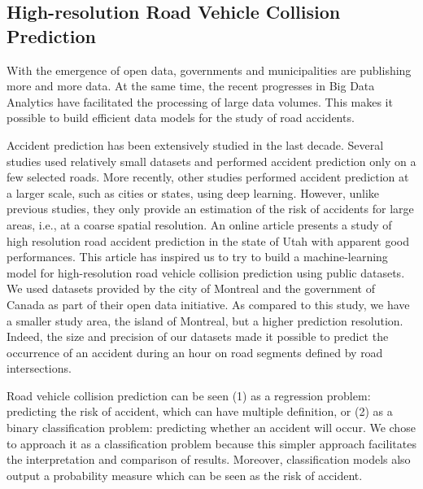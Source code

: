 \documentclass[conference]{IEEEtran}
\begin{document}

\subsection{High-resolution Road Vehicle Collision Prediction}

With the emergence of open data, governments and municipalities are publishing more and more data. At the same time, the recent progresses in Big Data Analytics have facilitated the processing of large data volumes. This makes it possible to build efficient data models for the study of road accidents.

Accident prediction has been extensively studied in the last decade. Several studies used relatively small datasets and performed accident prediction only on a few selected roads\cite{Chang2005, Chang2005b, Lin2015, Theofilatos2017}. More recently, other studies performed accident prediction at a larger scale, such as cities or states, using deep 
learning\cite{QChen2016, Najjar2017, Yuan2018}.
However, unlike previous studies, they only provide an estimation of the risk of accidents for large areas, i.e., at a coarse spatial resolution. An online article\cite{mediumarticle} presents a study of high resolution road accident prediction in the state of Utah with apparent good performances. This article has inspired us to try to build a machine-learning model for high-resolution road vehicle collision prediction using public datasets. We used datasets provided by the city of Montreal and the government of Canada as part of their open data initiative. As compared to this study, we have a smaller study area, the island of Montreal, but a higher prediction resolution. Indeed, the size and precision of our datasets made it possible to predict the occurrence of an accident during an hour on road segments defined by road intersections.

Road vehicle collision prediction can be seen (1) as a regression problem: predicting the risk of accident, which can have multiple definition, or (2) as a binary classification problem: predicting whether an accident will occur. 
We chose to approach it as a classification problem because this simpler approach facilitates the interpretation and comparison of results.
Moreover, classification models also output a probability measure which can be seen as the risk of accident.

\end{document}
